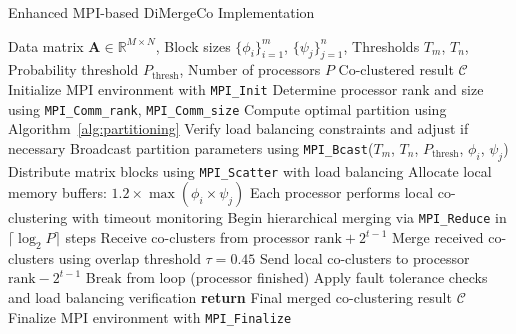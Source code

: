 \documentclass[journal]{IEEEtran}
\begin{document}
\begin{algorithm}[!t]
    \caption{Enhanced MPI-based DiMergeCo Implementation}
    \begin{algorithmic}[1]
        \REQUIRE Data matrix $\mathbf{A} \in \mathbb{R}^{M \times N}$, Block sizes $\{\phi_i\}_{i=1}^m$, $\{\psi_j\}_{j=1}^n$, Thresholds $T_m$, $T_n$, Probability threshold $P_{\text{thresh}}$, Number of processors $P$
        \ENSURE Co-clustered result $\mathcal{C}$
        \STATE Initialize MPI environment with \texttt{MPI\_Init}
        \STATE Determine processor rank and size using \texttt{MPI\_Comm\_rank}, \texttt{MPI\_Comm\_size}
        \STATE Compute optimal partition using Algorithm~\ref{alg:partitioning}
        \STATE Verify load balancing constraints and adjust if necessary
        \ENDIF
        \STATE Broadcast partition parameters using \texttt{MPI\_Bcast}($T_m$, $T_n$, $P_{\text{thresh}}$, $\phi_i$, $\psi_j$)
        \STATE Distribute matrix blocks using \texttt{MPI\_Scatter} with load balancing
        \STATE Allocate local memory buffers: $1.2 \times \max(\phi_i \times \psi_j)$
        \STATE Each processor performs local co-clustering with timeout monitoring
        \STATE Begin hierarchical merging via \texttt{MPI\_Reduce} in $\lceil \log_2 P \rceil$ steps
        \STATE Receive co-clusters from processor $\text{rank} + 2^{t-1}$
        \STATE Merge received co-clusters using overlap threshold $\tau = 0.45$
        \STATE Send local co-clusters to processor $\text{rank} - 2^{t-1}$
        \STATE Break from loop (processor finished)
        \ENDIF
        \ENDFOR
        \STATE Apply fault tolerance checks and load balancing verification
        \STATE \textbf{return} Final merged co-clustering result $\mathcal{C}$
        \ENDIF
        \STATE Finalize MPI environment with \texttt{MPI\_Finalize}
    \end{algorithmic}
    \label{alg:mpi-method}
\end{algorithm}
\end{document}
